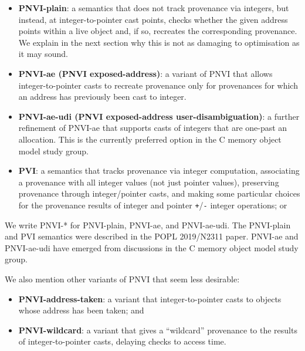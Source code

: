 \documentclass[acmsmall,review,screen]{acmart}\settopmatter{printfolios=true,printccs=false,printacmref=false}
\begin{document}
\begin{itemize}
\item \textbf{PNVI-plain}: a semantics that does not track provenance via integers,
but instead, at integer-to-pointer cast points, checks whether the 
given address points within a live object and, if so, recreates the
corresponding provenance.  We explain in the next section why this is not as damaging to
optimisation as it may sound.

\item \textbf{PNVI-ae (PNVI exposed-address)}: a variant of PNVI that
  allows integer-to-pointer casts to recreate provenance only for
  provenances for which an address has previously been cast to
  integer. 

  \item \textbf{PNVI-ae-udi (PNVI exposed-address
    user-disambiguation)}: a further refinement of PNVI-ae that
supports casts of integers that are one-past an allocation.
This is the currently preferred option in the C memory object model
study group. 

\item \textbf{PVI}: a semantics that tracks provenance via integer computation,
associating a provenance with all integer values (not just pointer
values),
preserving provenance through integer/\break{}pointer casts, and making some
particular choices for the provenance results of integer and
pointer \lstinline{+}/\lstinline{-} integer operations;
or
\end{itemize}
We write PNVI-* for PNVI-plain, PNVI-ae, and PNVI-ae-udi.
The PNVI-plain and PVI semantics were described in the POPL 2019/N2311
paper.  PNVI-ae and PNVI-ae-udi have emerged from discussions in the C
memory object model study group. 


We also mention other variants of PNVI that seem less desirable:
\begin{itemize}
\item \textbf{PNVI-address-taken}: a variant that integer-to-pointer
  casts  to objects
whose address has been taken;  and
\item \textbf{PNVI-wildcard}: a variant that gives a ``wildcard''
provenance to the results of integer-to-pointer casts, delaying checks
to access time.
\end{itemize}
%
\end{document}
